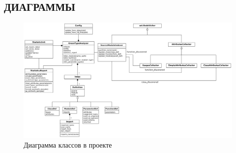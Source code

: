 
\begin{turn}{90}
  \begin{minipage}{0.69\paperheight}
    \chapter{ДИАГРАММЫ}
    \label{app:diagrams}
    \begin{figure}[H]
      \centering
      \includegraphics[width=\textwidth]{fig/classes-diag.png}
      \caption{Диаграмма классов в проекте}
      \label{fig:classes-diag}
    \end{figure}
  \end{minipage}
\end{turn}




